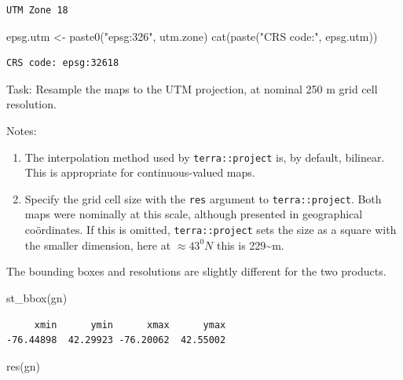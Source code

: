 \documentclass[
  letterpaper,
  DIV=11,
  numbers=noendperiod]{scrartcl}
\newenvironment{Shaded}{\begin{snugshade}}{\end{snugshade}}
\newcommand{\FunctionTok}[1]{\textcolor[rgb]{0.28,0.35,0.67}{#1}}
\newcommand{\NormalTok}[1]{\textcolor[rgb]{0.00,0.23,0.31}{#1}}
\newcommand{\OtherTok}[1]{\textcolor[rgb]{0.00,0.23,0.31}{#1}}
\newcommand{\StringTok}[1]{\textcolor[rgb]{0.13,0.47,0.30}{#1}}
\providecommand{\tightlist}{%
  \setlength{\itemsep}{0pt}\setlength{\parskip}{0pt}}\usepackage{longtable,booktabs,array}
\begin{document}
\begin{verbatim}
UTM Zone 18
\end{verbatim}

\begin{Shaded}
\begin{Highlighting}[]
\NormalTok{epsg.utm }\OtherTok{\textless{}{-}} \FunctionTok{paste0}\NormalTok{(}\StringTok{"epsg:326"}\NormalTok{, utm.zone)}
\FunctionTok{cat}\NormalTok{(}\FunctionTok{paste}\NormalTok{(}\StringTok{"CRS code:"}\NormalTok{, epsg.utm))}
\end{Highlighting}
\end{Shaded}

\begin{verbatim}
CRS code: epsg:32618
\end{verbatim}

Task: Resample the maps to the UTM projection, at nominal 250 m grid
cell resolution.

Notes:

\begin{enumerate}
\def\labelenumi{\arabic{enumi}.}
\tightlist
\item
  The interpolation method used by \texttt{terra::project} is, by
  default, bilinear. This is appropriate for continuous-valued maps.
\item
  Specify the grid cell size with the \texttt{res} argument to
  \texttt{terra::project}. Both maps were nominally at this scale,
  although presented in geographical coördinates. If this is omitted,
  \texttt{terra::project} sets the size as a square with the smaller
  dimension, here at \(\approx 43^{0}N\) this is 229\textasciitilde m.
\end{enumerate}

The bounding boxes and resolutions are slightly different for the two
products.

\begin{Shaded}
\begin{Highlighting}[]
\FunctionTok{st\_bbox}\NormalTok{(gn)}
\end{Highlighting}
\end{Shaded}

\begin{verbatim}
     xmin      ymin      xmax      ymax 
-76.44898  42.29923 -76.20062  42.55002 
\end{verbatim}

\begin{Shaded}
\begin{Highlighting}[]
\FunctionTok{res}\NormalTok{(gn)}
\end{Highlighting}
\end{Shaded}
\end{document}
